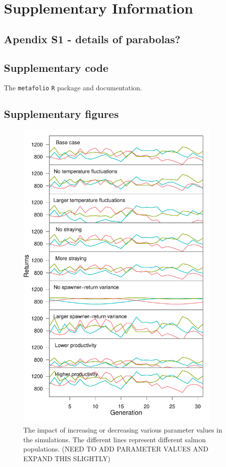 \section{Supplementary Information}

\subsection{Apendix S1 - details of parabolas?}

\subsection{Supplementary code}

The \texttt{metafolio} \texttt{R} package and documentation.

\subsection{Supplementary figures}

\begin{figure}[htbp]
\centering
\includegraphics[width=4.0in]{../examples/figure/plot-various-options-ts-3pops.pdf}
\caption{The impact of increasing or decreasing various parameter values in the simulations. The different lines represent different salmon populations. (NEED TO ADD PARAMETER VALUES AND EXPAND THIS SLIGHTLY)}
\label{f:eg-sens}
\end{figure}

